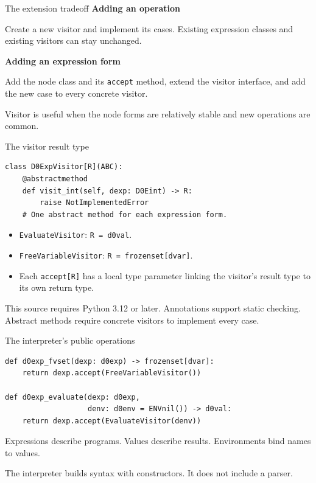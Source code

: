 \documentclass[aspectratio=169,11pt]{beamer}
\newcommand{\code}[1]{\texttt{#1}}
\begin{document}
\begin{frame}{The extension tradeoff}
\textbf{Adding an operation}\par
Create a new visitor and implement its cases. Existing expression classes
and existing visitors can stay unchanged.
\bigskip

\textbf{Adding an expression form}\par
Add the node class and its \code{accept} method, extend the visitor interface,
and add the new case to every concrete visitor.
\bigskip

Visitor is useful when the node forms are relatively stable and new
operations are common.
\end{frame}

\begin{frame}[fragile]{The visitor result type}
\begin{lstlisting}
class D0ExpVisitor[R](ABC):
    @abstractmethod
    def visit_int(self, dexp: D0Eint) -> R:
        raise NotImplementedError
    # One abstract method for each expression form.
\end{lstlisting}
\begin{itemize}
\item \code{EvaluateVisitor}: \code{R = d0val}.
\item \code{FreeVariableVisitor}: \code{R = frozenset[dvar]}.
\item Each \code{accept[R]} has a local type parameter linking the visitor's result type to its own return type.
\end{itemize}
This source requires Python 3.12 or later. Annotations support static checking.
Abstract methods require concrete visitors to implement every case.
\end{frame}

\begin{frame}[fragile]{The interpreter's public operations}
\begin{lstlisting}
def d0exp_fvset(dexp: d0exp) -> frozenset[dvar]:
    return dexp.accept(FreeVariableVisitor())

def d0exp_evaluate(dexp: d0exp,
                   denv: d0env = ENVnil()) -> d0val:
    return dexp.accept(EvaluateVisitor(denv))
\end{lstlisting}
Expressions describe programs. Values describe results.
Environments bind names to values.
\medskip

The interpreter builds syntax with constructors. It does not include a parser.
\end{frame}
\end{document}
